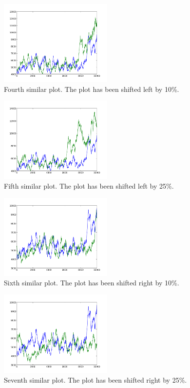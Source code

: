 \begin{figure}[h!]
    \centering
    \includegraphics[width=0.5\textwidth]{images/mutant_4.png}
    \caption{Fourth similar plot.  The plot has been shifted left by 10\%.}
    \label{fig:mutant_4}
\end{figure}

\begin{figure}[h!]
    \centering
    \includegraphics[width=0.5\textwidth]{images/mutant_5.png}
    \caption{Fifth similar plot.  The plot has been shifted left by 25\%.}
    \label{fig:mutant_5}
\end{figure}

\begin{figure}[h!]
    \centering
    \includegraphics[width=0.5\textwidth]{images/mutant_6.png}
    \caption{Sixth similar plot.  The plot has been shifted right by 10\%.}
    \label{fig:mutant_6}
\end{figure}

\begin{figure}[h!]
    \centering
    \includegraphics[width=0.5\textwidth]{images/mutant_7.png}
    \caption{Seventh similar plot.  The plot has been shifted right by 25\%.}
    \label{fig:mutant_7}
\end{figure}

